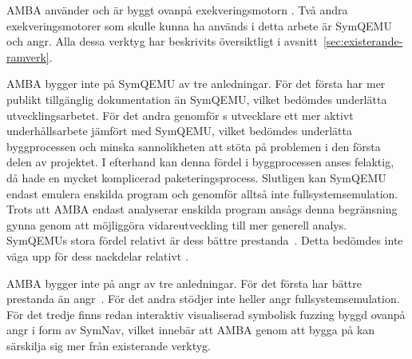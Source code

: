 AMBA använder och är byggt ovanpå exekveringsmotorn \stoe{}. Två andra
exekveringsmotorer som skulle kunna ha används i detta arbete är SymQEMU och
angr. Alla dessa verktyg har beskrivits översiktligt i
avsnitt~\ref{sec:existerande-ramverk}.

AMBA bygger inte på SymQEMU av tre anledningar. För det första har \stoe{} mer
publikt tillgänglig dokumentation än SymQEMU, vilket bedömdes underlätta
utvecklingsarbetet. För det andra genomför \stoe{}s utvecklare ett mer aktivt
underhållsarbete jämfört med SymQEMU, vilket bedömdes underlätta byggprocessen
och minska sannolikheten att stöta på problemen i den första delen av projektet.
I efterhand kan denna fördel i byggprocessen anses felaktig, då \stoe{} hade en
mycket komplicerad paketeringsprocess. Slutligen kan SymQEMU endast emulera
enskilda program och genomför alltså inte fullsystemsemulation. Trots att AMBA
endast analyserar enskilda program ansågs denna begränsning gynna \stoe{} genom
att möjliggöra vidareutveckling till mer generell analys. SymQEMUs stora fördel
relativt \stoe{} är dess bättre prestanda~\cite{systematic_comparison_symbex}.
Detta bedömdes inte väga upp för dess nackdelar relativt \stoe{}.

AMBA bygger inte på angr av tre anledningar. För det första har \stoe{} bättre
prestanda än angr~\cite{systematic_comparison_symbex}. För det andra stödjer
inte heller angr fullsystemsemulation. För det tredje finns redan interaktiv
visualiserad symbolisk fuzzing byggd ovanpå angr i form av SymNav, vilket
innebär att AMBA genom att bygga på \stoe{} kan särskilja sig mer från
existerande verktyg.
